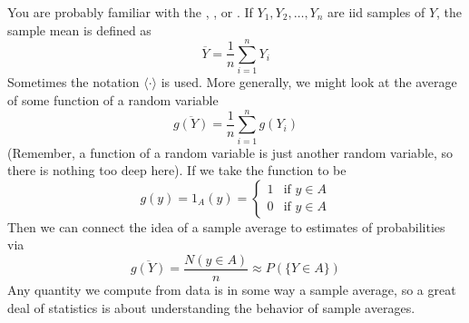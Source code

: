  You are probably familiar with the , , or . 
If $Y_1,Y_2,\dots,Y_n$ are iid samples of $Y$, the sample mean is defined as
\begin{equation*}
\overline{Y} = \frac{1}{n}\sum_{i=1}^nY_i
\end{equation*}
Sometimes the notation $\langle \cdot \rangle$ is used. 
More generally, we might look at the average of some function of a random variable 
\begin{equation*}
\overline{g(Y)} = \frac{1}{n}\sum_{i=1}^ng(Y_i)
\end{equation*}
(Remember, a function of a random variable is just another random variable, so there is nothing too deep here). 
If we take the function to be 
\begin{equation}
g(y) =1_A(y) =  \left\{\begin{array}{lr} 
1 & \text{if }y \in A\\
0 & \text{if }y \in A
\end{array}\right.
\end{equation}
Then we can connect the idea of a sample average to estimates of probabilities via
\begin{equation}
\overline{g(Y)} = \frac{N(y \in A)}{n} \approx P(\{Y \in A\})
\end{equation}
Any quantity we compute from data is in some way a sample average, so a great deal of statistics is about understanding the behavior of sample averages. 

